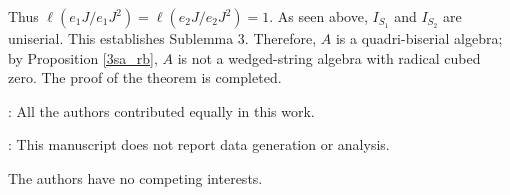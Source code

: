 \documentclass[10pt]{amsart}
\theoremstyle{definition}
\begin{document}
Thus $\ell(e_1J/e_1J^2)=\ell(e_2J/e_2J^2)=1$. As seen above, $I_{S_1}$ and $I_{S_2}$ are uniserial. This establishes Sublemma 3. Therefore, $A$ is a quadri-biserial algebra; by Proposition \ref{3sa_rb}, $A$ is not a wedged-string algebra with radical cubed zero. The proof of the theorem is completed. 

\bigskip

: All the authors contributed equally in this work.

\smallskip

: This manuscript does not report data generation or analysis.

\smallskip

 The authors have no competing interests.
\end{document}

